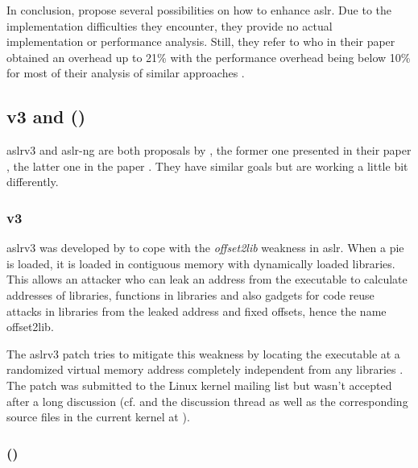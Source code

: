 \bigskip\noindent
In conclusion, \citeauthor{Shacham2004} propose several possibilities on how to enhance \gls{aslr}.
Due to the implementation difficulties they encounter, they provide no actual implementation or performance analysis.
Still, they refer to \cite{Bhatkar2003} who in their paper  obtained an overhead up to 21\% with the performance overhead being below 10\% for most of their analysis of similar approaches \cite[117]{Bhatkar2003}.

\subsection{v3 and  ()}
\label{subsec:aslrv3-aslr-ng}

\acs{aslr}v3 and \gls{aslr-ng} are both proposals by \citeauthor{MarcoGisbert2014}, the former one presented in their \citeyear{MarcoGisbert2014} paper , the latter one in the \citeyear{MarcoGisbert2016} paper .
They have similar goals but are working a little bit differently.

\subsubsection{v3}
\label{subsubsec:aslrv3}

\acs{aslr}v3 was developed by \citeauthor{MarcoGisbert2014} to cope with the \emph{offset2lib} weakness in \gls{aslr}.
When a \gls{pie} is loaded, it is loaded in contiguous memory with dynamically loaded libraries.
This allows an attacker who can leak an address from the executable to calculate addresses of libraries, functions in libraries and also gadgets for code reuse attacks in libraries from the leaked address and fixed offsets, hence the name offset2lib.

The \acs{aslr}v3 patch tries to mitigate this weakness by locating the executable at a randomized virtual memory address completely independent from any libraries \cite{MarcoGisbert2014}.
The patch was submitted to the Linux kernel mailing list but wasn't accepted after a long discussion (cf. \cite{MarcoGisbert2014a} and the discussion thread as well as the corresponding source files in the current kernel at \cite{LKD2020}).

\subsubsection{ ()}
\label{subsubsec:aslr-ng}

